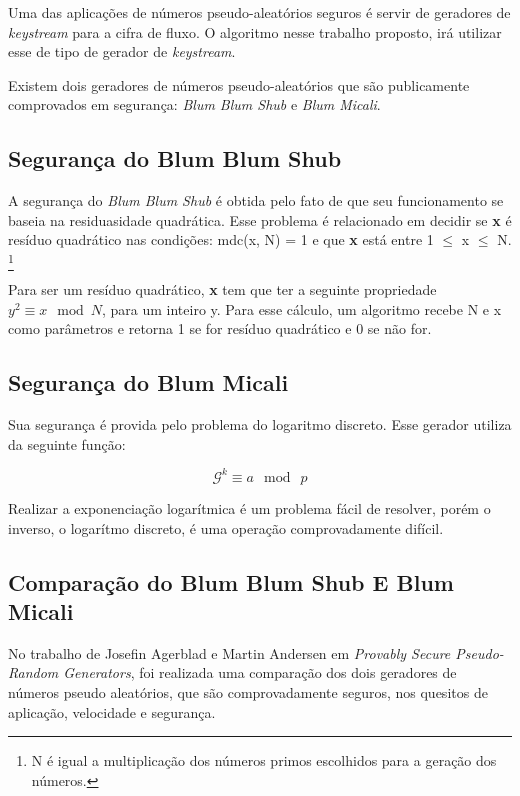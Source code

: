 Uma das aplicações de números pseudo-aleatórios seguros é servir de geradores de \textit{keystream} para a cifra de fluxo. O algoritmo nesse trabalho proposto, irá utilizar esse de tipo de gerador de \textit{keystream}.

Existem dois geradores de números pseudo-aleatórios que são publicamente comprovados em segurança: \textit{Blum Blum Shub} e \textit{Blum Micali}.

\subsection{Segurança do Blum Blum Shub}

A segurança do \textit{Blum Blum Shub} é obtida pelo fato de que seu funcionamento se baseia na residuasidade quadrática. Esse problema é relacionado em decidir se \textbf{x} é resíduo quadrático nas condições: mdc(x, N) = 1 e que \textbf{x} está entre 1 $\le$  x $\le$ N. \footnote{N é igual a multiplicação dos números primos escolhidos para a geração dos números.}

Para ser um resíduo quadrático, \textbf{x} tem que ter a seguinte propriedade $y ^ 2 \equiv x \: \bmod N$, para um inteiro y. Para esse cálculo, um algoritmo recebe N e x como parâmetros e retorna 1 se for resíduo quadrático e 0 se não for.~\cite{josefin-martin}

\subsection{Segurança do Blum Micali}

Sua segurança é provida pelo problema do logaritmo discreto. Esse gerador utiliza da seguinte função:

\begin{equation}
	\mathcal{G}^k \equiv a \: \bmod \: p 
\end{equation}

Realizar a exponenciação logarítmica é um problema fácil de resolver, porém o inverso, o logarítmo discreto, é uma operação comprovadamente difícil.

\subsection{Comparação do Blum Blum Shub E Blum Micali}

No trabalho de Josefin Agerblad e  Martin Andersen em \textit{Provably Secure Pseudo-Random Generators}, foi realizada uma comparação dos dois geradores de números pseudo aleatórios, que são comprovadamente seguros, nos quesitos de aplicação, velocidade e segurança.

